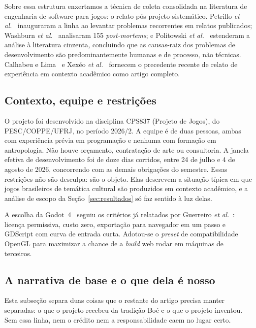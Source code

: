 \documentclass[conference]{IEEEtran}
\begin{document}
Sobre essa estrutura enxertamos a técnica de coleta consolidada na literatura de
engenharia de software para jogos: o relato pós-projeto sistemático. Petrillo
\textit{et al.}~\cite{petrillo2009} inauguraram a linha ao levantar problemas
recorrentes em relatos publicados; Washburn \textit{et al.}~\cite{washburn2016}
analisaram 155 \textit{post-mortems}; e Politowski
\textit{et al.}~\cite{politowski2021} estenderam a análise à literatura cinzenta,
concluindo que as causas-raiz dos problemas de desenvolvimento são predominantemente
humanas e de processo, não técnicas. Calhabeu e Lima~\cite{calhabeu2025} e Xexéo
\textit{et al.}~\cite{xexeo2026enigma} fornecem o precedente recente de relato de
experiência em contexto acadêmico como artigo completo.

\subsection{Contexto, equipe e restrições}

O projeto foi desenvolvido na disciplina CPS837 (Projeto de Jogos), do PESC/COPPE/UFRJ,
no período 2026/2. A equipe é de duas pessoas, ambas com experiência prévia em
programação e nenhuma com formação em antropologia. Não houve orçamento, contratação de
arte ou consultoria. A janela efetiva de desenvolvimento foi de doze dias corridos,
entre 24 de julho e 4 de agosto de 2026, concorrendo com as demais obrigações do
semestre. Essas restrições não são desculpa: são o objeto. Elas descrevem a situação
típica em que jogos brasileiros de temática cultural são produzidos em contexto
acadêmico, e a análise de escopo da Seção~\ref{sec:resultados} só faz sentido à luz
delas.

A escolha da Godot~4~\cite{godot2026} seguiu os critérios já relatados por Guerreiro
\textit{et al.}~\cite{guerreiro2021}: licença permissiva, custo zero, exportação para
navegador em um passo e GDScript com curva de entrada curta. Adotou-se o \textit{preset}
de compatibilidade OpenGL para maximizar a chance de a \textit{build} web rodar em
máquinas de terceiros.

\subsection{A narrativa de base e o que dela é nosso}
\label{sec:procedencia}

Esta subseção separa duas coisas que o restante do artigo precisa manter separadas: o que
o projeto recebeu da tradição Boé e o que o projeto inventou. Sem essa linha, nem o
crédito nem a responsabilidade caem no lugar certo.
\end{document}
